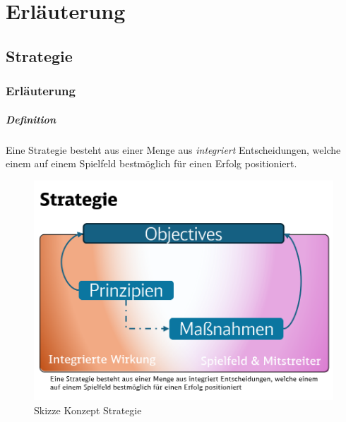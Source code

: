 \pagebreak
\chapter{Erläuterung}

\section{Strategie} \label{Appendix_Erlaeuterung_Strategie}

\subsection{Erläuterung}
\paragraph{Definition}
Eine Strategie besteht aus einer Menge aus \textit{integriert} Entscheidungen, welche einem auf einem Spielfeld bestmöglich für einen Erfolg positioniert.\\




\begin{figure}[H]
	\centering
	\includegraphics[scale = 0.3]{attachment/chapter_OWN/Scc006.png}
	\caption{Skizze Konzept Strategie}
\end{figure} 

